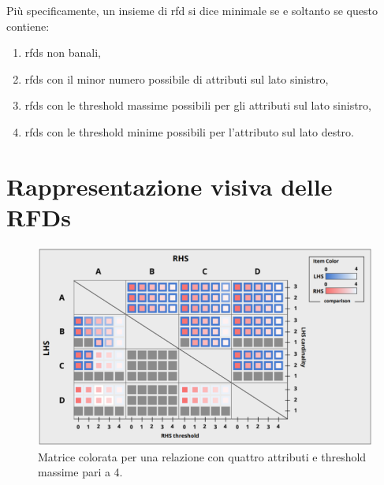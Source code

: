 Pi\`{u} specificamente, un insieme di \acrshort{rfd} si dice minimale se e soltanto se questo contiene:
\begin{enumerate}
    \item \acrshort{rfds} non banali,
    \item \acrshort{rfds} con il minor numero possibile di attributi sul lato sinistro,
    \item \acrshort{rfds} con le threshold massime possibili per gli attributi sul lato sinistro,
    \item \acrshort{rfds} con le threshold minime possibili per l'attributo sul lato destro.
\end{enumerate}

\section{Rappresentazione visiva delle RFDs}
\label{section:visual_rep_metaphore}
\begin{figure}[ht]
    \centering
    \includegraphics[width=\linewidth]{capitoli/figure/matrix_metaphore}
    \caption{Matrice colorata per una relazione con quattro attributi e threshold massime pari a 4.}
    \label{fig:colored_matrix}
\end{figure}
